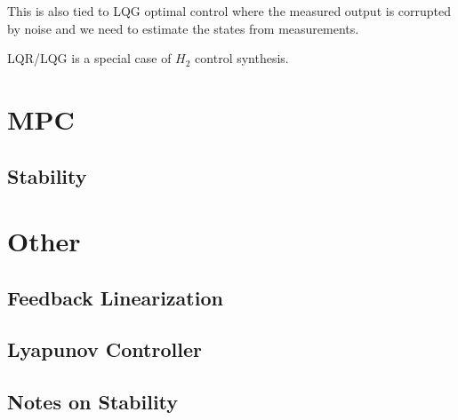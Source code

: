 This is also tied to LQG optimal control where the measured output is corrupted by noise and we need to estimate the states from measurements. 

LQR/LQG is a special case of $H_2$ control synthesis.

\section{MPC}
\subsection{Stability}
\section{Other}
\subsection{Feedback Linearization}
\subsection{Lyapunov Controller}
\subsection{Notes on Stability}